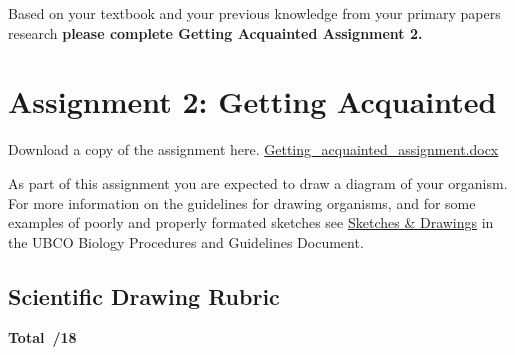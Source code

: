 \documentclass[
]{book}
\begin{document}
Based on your textbook and your previous knowledge from your primary papers research \textbf{please complete Getting Acquainted Assignment 2.}

\hypertarget{assignment-2-getting-acquainted}{%
\chapter*{Assignment 2: Getting Acquainted}\label{assignment-2-getting-acquainted}}

Download a copy of the assignment here. \href{https://osf.io/download/xz2rk}{Getting\_acquainted\_assignment.docx}

As part of this assignment you are expected to draw a diagram of your organism. For more information on the guidelines for drawing organisms, and for some examples of poorly and properly formated sketches see \href{https://ubco-biology.github.io/Procedures-and-Guidelines/sketches-drawings.html}{Sketches \& Drawings} in the UBCO Biology Procedures and Guidelines Document.

\hypertarget{scientific-drawing-rubric}{%
\section*{Scientific Drawing Rubric}\label{scientific-drawing-rubric}}

\textbf{Total~/18}
\end{document}
